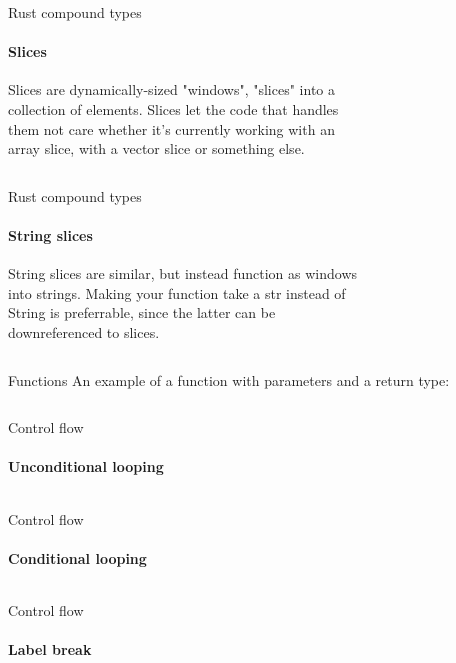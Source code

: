 \documentclass[usenames,dvipsnames,10pt,aspectratio=169]{beamer}
\begin{document}
\begin{frame}{Rust compound types}
\framesubtitle{Slices}
Slices are dynamically-sized "windows", "slices" into a\\
collection of elements. Slices let the code that handles\\
them not care whether it's currently working with an\\
array slice, with a vector slice or something else.
\vspace{0.2cm}
\inputminted[fontsize=\large]{rust}{code/slice.rs}
\vspace{0.5cm}
\end{frame}

\begin{frame}{Rust compound types}
\framesubtitle{String slices}
String slices are similar, but instead function as windows\\
into strings. Making your function take a \textcolor{ucuyellow}{str} instead of \\
\textcolor{ucuyellow}{String} is preferrable, since the latter can be\\
downreferenced to slices.
\vspace{0.2cm}
\inputminted[fontsize=\large]{rust}{code/str.rs}
\vspace{0.5cm}
\end{frame}

\begin{frame}{Functions}
\large
An example of a function with parameters and a return type:
\vspace{0.2cm}
\inputminted[fontsize=\large]{rust}{code/function.rs}
\vspace{0.5cm}
\end{frame}

\begin{frame}{Control flow}
	\framesubtitle{Unconditional looping}
\inputminted[fontsize=\Large]{rust}{code/control1.rs}
\vspace{0.7cm}
\end{frame}

\begin{frame}{Control flow}
	\framesubtitle{Conditional looping}
\inputminted[fontsize=\Large]{rust}{code/control2.rs}
\vspace{0.7cm}
\end{frame}

\begin{frame}{Control flow}
	\framesubtitle{Label break}
\inputminted[fontsize=\Large]{rust}{code/control3.rs}
\end{frame}
\end{document}
